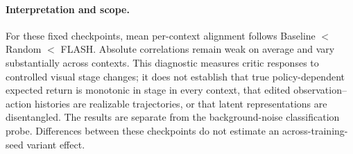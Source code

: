 \paragraph{Interpretation and scope.}
For these fixed checkpoints, mean per-context alignment follows Baseline $<$ Random $<$ FLASH. Absolute correlations remain weak on average and vary substantially across contexts. This diagnostic measures critic responses to controlled visual stage changes; it does not establish that true policy-dependent expected return is monotonic in stage in every context, that edited observation--action histories are realizable trajectories, or that latent representations are disentangled. The results are separate from the background-noise classification probe. Differences between these checkpoints do not estimate an across-training-seed variant effect.
